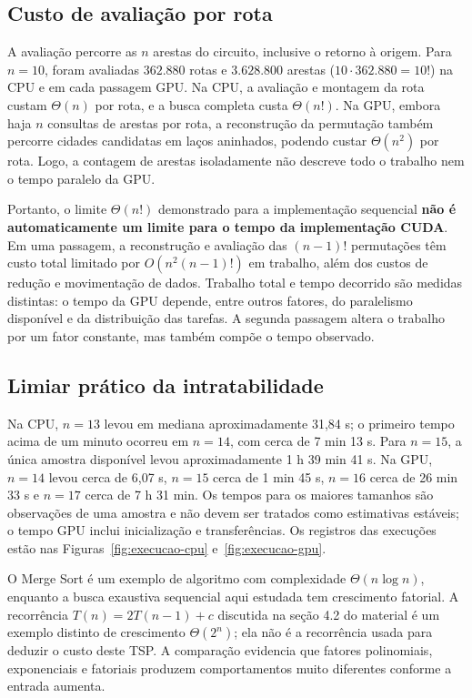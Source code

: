 \documentclass[12pt,a4paper]{article}
\begin{document}
\subsection{Custo de avaliação por rota}

A avaliação percorre as $n$ arestas do circuito, inclusive o retorno à origem. Para $n=10$, foram avaliadas $362.880$ rotas e $3.628.800$ arestas ($10\cdot362.880=10!$) na CPU e em cada passagem GPU. Na CPU, a avaliação e montagem da rota custam $\Theta(n)$ por rota, e a busca completa custa $\Theta(n!)$. Na GPU, embora haja $n$ consultas de arestas por rota, a reconstrução da permutação também percorre cidades candidatas em laços aninhados, podendo custar $\Theta(n^2)$ por rota. Logo, a contagem de arestas isoladamente não descreve todo o trabalho nem o tempo paralelo da GPU.

Portanto, o limite $\Theta(n!)$ demonstrado para a implementação sequencial \textbf{não é automaticamente um limite para o tempo da implementação CUDA}. Em uma passagem, a reconstrução e avaliação das $(n-1)!$ permutações têm custo total limitado por $O(n^2(n-1)!)$ em trabalho, além dos custos de redução e movimentação de dados. Trabalho total e tempo decorrido são medidas distintas: o tempo da GPU depende, entre outros fatores, do paralelismo disponível e da distribuição das tarefas. A segunda passagem altera o trabalho por um fator constante, mas também compõe o tempo observado.

\subsection{Limiar prático da intratabilidade}

Na CPU, $n=13$ levou em mediana aproximadamente 31,84 s; o primeiro tempo acima de um minuto ocorreu em $n=14$, com cerca de 7 min 13 s. Para $n=15$, a única amostra disponível levou aproximadamente 1 h 39 min 41 s. Na GPU, $n=14$ levou cerca de 6,07 s, $n=15$ cerca de 1 min 45 s, $n=16$ cerca de 26 min 33 s e $n=17$ cerca de 7 h 31 min. Os tempos para os maiores tamanhos são observações de uma amostra e não devem ser tratados como estimativas estáveis; o tempo GPU inclui inicialização e transferências. Os registros das execuções estão nas Figuras~\ref{fig:execucao-cpu} e~\ref{fig:execucao-gpu}.

O Merge Sort é um exemplo de algoritmo com complexidade $\Theta(n\log n)$, enquanto a busca exaustiva sequencial aqui estudada tem crescimento fatorial. A recorrência $T(n)=2T(n-1)+c$ discutida na seção 4.2 do material é um exemplo distinto de crescimento $\Theta(2^n)$; ela não é a recorrência usada para deduzir o custo deste TSP. A comparação evidencia que fatores polinomiais, exponenciais e fatoriais produzem comportamentos muito diferentes conforme a entrada aumenta.
\end{document}
